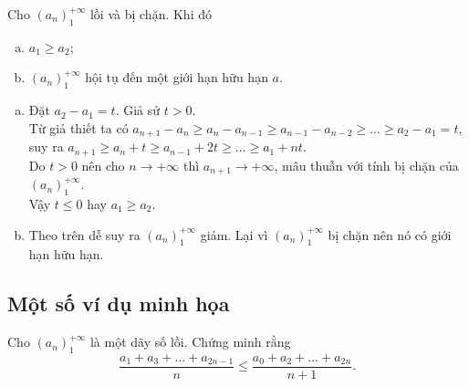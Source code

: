 \begin{dl}
	Cho $\left(a_n\right)_{1}^{+\infty}$ lồi và bị chặn. Khi đó
	\begin{enumerate}[a)]
		\item $a_1 \ge a_2$;
		\item $\left(a_n\right)_{1}^{+\infty}$ hội tụ đến một giới hạn hữu hạn $a$.
	\end{enumerate}
\end{dl}

\begin{cm}
	\hspace{0.2cm}
	\begin{enumerate}[a)]
		\item Đặt $a_2-a_1=t$. Giả sử $t>0$.\\ 
		Từ giả thiết ta có $a_{n+1}-a_{n} \ge a_n-a_{n-1} \ge a_{n-1}-a_{n-2} \ge \ldots \ge a_2-a_1=t$, suy ra $a_{n+1} \ge a_n+t \ge a_{n-1}+2t \ge \ldots \ge a_1+nt$.\\
		Do $t>0$ nên cho $n \rightarrow +\infty$ thì $a_{n+1} \rightarrow +\infty$, mâu thuẫn với tính bị chặn của $\left(a_n\right)_{1}^{+\infty}$.\\
		Vậy $t \le 0$ hay $a_1 \ge a_2$.
		\item Theo trên dễ suy ra $\left(a_n\right)_{1}^{+\infty}$ giảm. Lại vì $\left(a_n\right)_{1}^{+\infty}$ bị chặn nên nó có giới hạn hữu hạn.
	\end{enumerate}
\end{cm}

\subsection{Một số ví dụ minh họa}
\begin{vd}%
	Cho $\left(a_n\right)_{1}^{+\infty}$ là một dãy số lồi. Chứng minh rằng 
	$$\dfrac{a_1+a_3+\ldots+a_{2n-1}}{n} \le \dfrac{a_0+a_2+\ldots+a_{2n}}{n+1}.$$
\end{vd}


